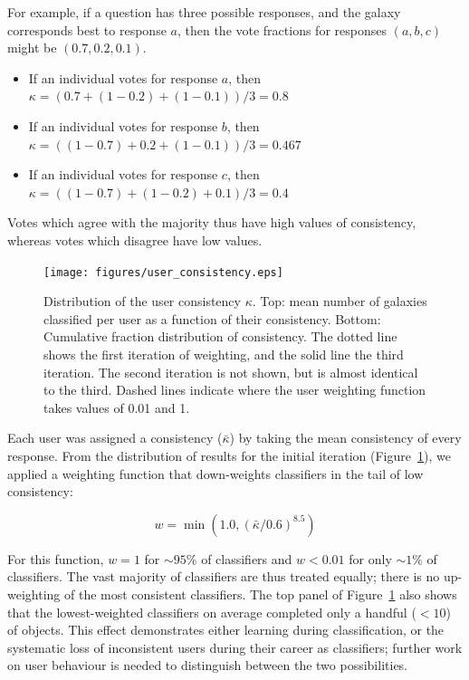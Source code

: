 \documentclass[useAMS,usenatbib]{mn2e}
\begin{document}
For example, if a question has three possible responses, and the galaxy corresponds best to response $a$, then the vote fractions for responses $(a, b, c)$ might be $(0.7, 0.2, 0.1)$.
\begin{itemize}
\item If an individual votes for response $a$, then \\$\kappa = (0.7 + (1-0.2) + (1-0.1))/3 = 0.8$
\item If an individual votes for response $b$, then \\$\kappa = ((1-0.7) + 0.2 + (1-0.1))/3 = 0.467$
\item If an individual votes for response $c$, then \\$\kappa = ((1-0.7) + (1-0.2) + 0.1)/3 = 0.4$
\end{itemize}
\noindent Votes which agree with the majority thus have high values of consistency, whereas votes which disagree have low values.

\begin{figure}
\texttt{[image: figures/user\_consistency.eps]}
\caption{Distribution of the user consistency $\kappa$. Top: mean number of galaxies classified per user as a function of their consistency. Bottom: Cumulative fraction distribution of consistency. The dotted line shows the first iteration of weighting, and the solid line the third iteration. The second iteration is not shown, but is almost identical to the third. Dashed lines indicate where the user weighting function takes values of 0.01 and 1. 
\label{fig-consistency}}
\end{figure}

Each user was assigned a consistency ($\bar{\kappa}$) by taking the mean consistency of every response. From the distribution of results for the initial iteration (Figure~\ref{fig-consistency}), we applied a weighting function that down-weights classifiers in the tail of low consistency:

\begin{equation}
w = \min \left(1.0,(\bar{\kappa} / 0.6)^{8.5} \right)
\label{eqn-weight}
\end{equation}

\noindent For this function, $w=1$ for $\sim95\%$ of classifiers and $w<0.01$ for only $\sim1\%$ of classifiers. The vast majority of classifiers are thus treated equally; there is no up-weighting of the most consistent classifiers. The top panel of Figure~\ref{fig-consistency} also shows that the lowest-weighted classifiers on average completed only a handful ($<10$) of objects. This effect demonstrates either learning during classification, or the systematic loss of inconsistent users during their career as classifiers; further work on user behaviour is needed to distinguish between the two possibilities.
\end{document}
